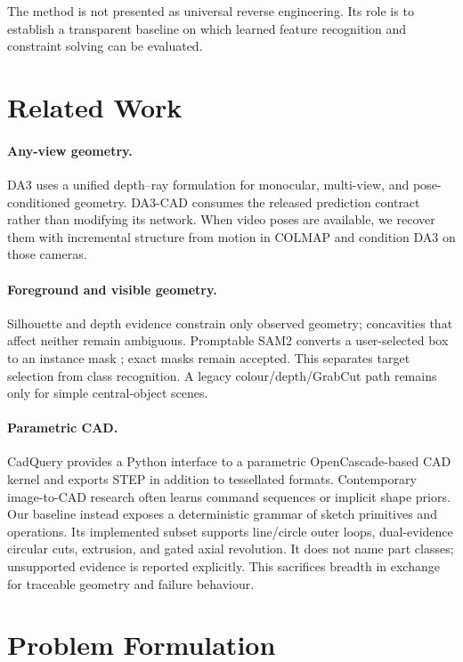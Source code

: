 \documentclass[10pt]{article}
\newcommand{\system}{DA3-CAD}
\begin{document}
The method is not presented as universal reverse engineering.  Its role is to
establish a transparent baseline on which learned feature recognition and
constraint solving can be evaluated.

\section{Related Work}

\paragraph{Any-view geometry.}
DA3 uses a unified depth--ray formulation for monocular, multi-view, and
pose-conditioned geometry\cite{lin2025depthanything3}.  \system{} consumes the
released prediction contract rather than modifying its network.  When video
poses are available, we recover them with incremental structure from motion in
COLMAP\cite{schonberger2016sfm} and condition DA3 on those cameras.

\paragraph{Foreground and visible geometry.}
Silhouette and depth evidence constrain only observed geometry; concavities
that affect neither remain ambiguous\cite{laurentini1994visualhull}.
Promptable SAM2 converts a user-selected box to an instance mask
\cite{ravi2024sam2}; exact masks remain accepted.  This separates target
selection from class recognition.  A legacy colour/depth/GrabCut path
\cite{rother2004grabcut} remains only for simple central-object scenes.

\paragraph{Parametric CAD.}
CadQuery provides a Python interface to a parametric OpenCascade-based CAD
kernel and exports STEP in addition to tessellated formats\cite{cadquery}.
Contemporary image-to-CAD research often learns command sequences or implicit
shape priors.  Our baseline instead exposes a deterministic grammar of sketch
primitives and operations.  Its implemented subset supports line/circle outer
loops, dual-evidence circular cuts, extrusion, and gated axial revolution.  It
does not name part classes; unsupported evidence is reported explicitly.  This sacrifices
breadth in exchange for traceable geometry and failure behaviour.

\section{Problem Formulation}
\end{document}
